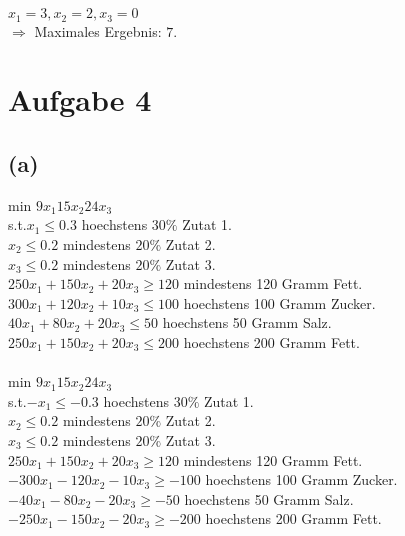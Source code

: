 \documentclass[a4paper]{scrartcl}
\begin{document}
\\
\\
\\
\\
\\
\\
\\
\newpage
$x_1 = 3, x_2 = 2, x_3 = 0$ \\
$\Rightarrow$ Maximales Ergebnis: $7$.





\section*{Aufgabe 4}
\subsection*{(a)}
min $9 x_1 15 x_2 24 x_3$\\
s.t.$x_1 \leq 0.3$ hoechstens $30\%$ Zutat 1.\\
$x_2 \leq 0.2$ mindestens $20\%$ Zutat 2.\\
$x_3 \leq 0.2$ mindestens $20\%$ Zutat 3.\\
$250 x_1 + 150 x_2 + 20 x_3 \geq 120$ mindestens 120 Gramm Fett.\\
$300 x_1 + 120 x_2 + 10 x_3 \leq 100$ hoechstens 100 Gramm Zucker.\\
$40 x_1 + 80 x_2 + 20 x_3 \leq 50$ hoechstens 50 Gramm Salz.\\
$250 x_1 + 150 x_2 + 20 x_3 \leq 200$ hoechstens 200 Gramm Fett.\\
\\
min $9 x_1 15 x_2 24 x_3$\\
s.t.$-x_1 \leq -0.3$ hoechstens $30\%$ Zutat 1.\\
$x_2 \leq 0.2$ mindestens $20\%$ Zutat 2.\\
$x_3 \leq 0.2$ mindestens $20\%$ Zutat 3.\\
$250 x_1 + 150 x_2 + 20 x_3 \geq 120$ mindestens 120 Gramm Fett.\\
$-300 x_1 - 120 x_2 - 10 x_3 \geq -100$ hoechstens 100 Gramm Zucker.\\
$-40 x_1 - 80 x_2 - 20 x_3 \geq -50$ hoechstens 50 Gramm Salz.\\
$-250 x_1 - 150 x_2 - 20 x_3 \geq -200$ hoechstens 200 Gramm Fett.\\
\end{document}
